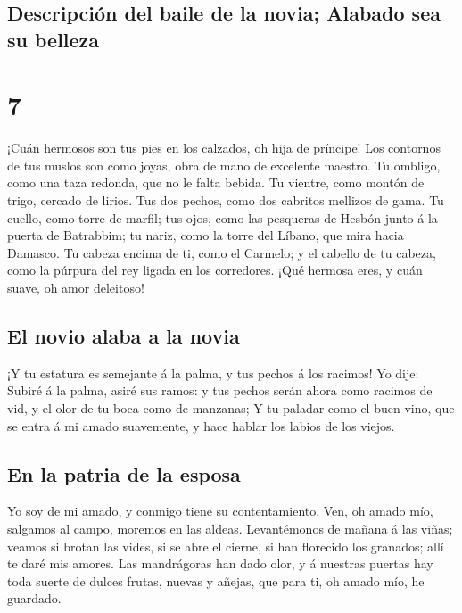 \hypertarget{descripciuxf3n-del-baile-de-la-novia-alabado-sea-su-belleza}{%
\subsection{Descripción del baile de la novia; Alabado sea su
belleza}\label{descripciuxf3n-del-baile-de-la-novia-alabado-sea-su-belleza}}

\hypertarget{section-6}{%
\section{7}\label{section-6}}

 ¡Cuán hermosos son tus pies en los calzados, oh hija de
príncipe! Los contornos de tus muslos son como joyas, obra de mano de
excelente maestro.  Tu ombligo, como una taza redonda, que
no le falta bebida. Tu vientre, como montón de trigo, cercado de lirios.
 Tus dos pechos, como dos cabritos mellizos de gama.
 Tu cuello, como torre de marfil; tus ojos, como las
pesqueras de Hesbón junto á la puerta de Batrabbim; tu nariz, como la
torre del Líbano, que mira hacia Damasco.  Tu cabeza
encima de ti, como el Carmelo; y el cabello de tu cabeza, como la
púrpura del rey ligada en los corredores.  ¡Qué hermosa
eres, y cuán suave, oh amor deleitoso!

\hypertarget{el-novio-alaba-a-la-novia}{%
\subsection{El novio alaba a la novia}\label{el-novio-alaba-a-la-novia}}

 ¡Y tu estatura es semejante á la palma, y tus pechos á
los racimos!  Yo dije: Subiré á la palma, asiré sus ramos:
y tus pechos serán ahora como racimos de vid, y el olor de tu boca como
de manzanas;  Y tu paladar como el buen vino, que se entra
á mi amado suavemente, y hace hablar los labios de los viejos.

\hypertarget{en-la-patria-de-la-esposa}{%
\subsection{En la patria de la esposa}\label{en-la-patria-de-la-esposa}}

 Yo soy de mi amado, y conmigo tiene su contentamiento.
 Ven, oh amado mío, salgamos al campo, moremos en las
aldeas.  Levantémonos de mañana á las viñas; veamos si
brotan las vides, si se abre el cierne, si han florecido los granados;
allí te daré mis amores.  Las mandrágoras han dado olor,
y á nuestras puertas hay toda suerte de dulces frutas, nuevas y añejas,
que para ti, oh amado mío, he guardado.

